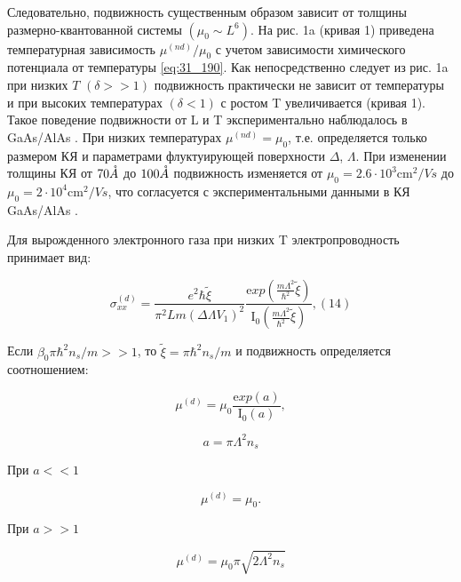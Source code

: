 Следовательно, подвижность существенным образом зависит от толщины размерно-квантованной системы $(\mu _{0} \sim L^{6} )$. На рис. 1a (кривая 1) приведена температурная зависимость $\mu ^{(nd)} /\mu _{0} $ с учетом зависимости химического потенциала от температуры \eqref{eq:31_190}. Как непосредственно следует из рис. 1a при низких $T$ $(\delta >>1)$ подвижность практически не зависит от температуры и при высоких температурах $(\delta <1)$ с ростом T увеличивается (кривая 1). Такое поведение подвижности от L и T экспериментально наблюдалось в GaAs/AlAs \cite{Sakaki1987}. При низких температурах $\mu ^{(nd)} =\mu _{0} $, т.е. определяется только размером КЯ и параметрами флуктуирующей поверхности $\Delta $, $\Lambda $. При изменении толщины КЯ от $70 \AA$ до $100 \AA$ подвижность изменяется от $\mu _{0} =2.6\cdot 10^{3} \text{cm}^{2} /{Vs}$ до $\mu _{0} =2\cdot 10^{4} \text{cm}^{2} /{Vs}$, что согласуется с экспериментальными данными в КЯ GaAs/AlAs \cite{Sakaki1987}.

Для вырожденного электронного газа при низких T электропроводность принимает вид:

\begin{equation} \label{eq:31_210}
\sigma _{xx}^{(d)} =\frac{e^{2} \hbar \tilde{\xi }}{\pi ^{2} Lm\left(\Delta \Lambda V_{1} \right)^{2} } \frac{{\mathrm exp}\left(\frac{m\Lambda ^{2} }{\hbar ^{2} } \tilde{\xi }\right)}{{\mathrm I}_{{\mathrm 0}} \left(\frac{m\Lambda ^{2} }{\hbar ^{2} } \tilde{\xi }\right)} ,    (14)
\end{equation}


Если $\beta _{0} \pi \hbar ^{2} n_{s} /m>>1$, то $\tilde{\xi }=\pi \hbar ^{2} n_{s} /m$ и подвижность определяется соотношением:

\begin{equation} \label{eq:31_220}
\mu ^{(d)} =\mu _{0} \frac{{\mathrm exp}\left(a\right)}{{\mathrm I}_{{\mathrm 0}} \left(a\right)},
\end{equation}

\[
a=\pi \Lambda ^{2} n_{s}
\]

При $a<<1$ 

\begin{equation} \label{eq:31_230}     
\mu ^{(d)} =\mu _{0}.
\end{equation}

При $a>>1$

\begin{equation} \label{eq:31_240}  
\mu ^{(d)} =\mu _{0} \pi \sqrt{2\Lambda ^{2} n_{s} }
\end{equation}

